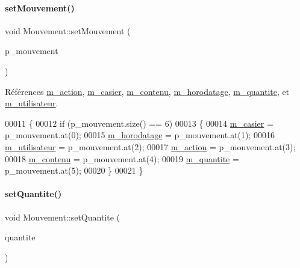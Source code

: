 \paragraph{\texorpdfstring{set\+Mouvement()}{setMouvement()}}
{\footnotesize\ttfamily void Mouvement\+::set\+Mouvement (\begin{DoxyParamCaption}\item[{Q\+String\+List}]{p\+\_\+mouvement }\end{DoxyParamCaption})}



Références \hyperlink{class_mouvement_af0444a7f837bdf252f2a3ccd4eb8a701}{m\+\_\+action}, \hyperlink{class_mouvement_a186f483cf82ff2866da1e10031838567}{m\+\_\+casier}, \hyperlink{class_mouvement_a631b133243576c36fec6e1912415d7d6}{m\+\_\+contenu}, \hyperlink{class_mouvement_a24f34a74c17068f6c98635400862adcd}{m\+\_\+horodatage}, \hyperlink{class_mouvement_ab6040d52ca99ef88d253b1742e70ffd3}{m\+\_\+quantite}, et \hyperlink{class_mouvement_adee253bf00365d1cb4c45bd58d8b3e58}{m\+\_\+utilisateur}.


\begin{DoxyCode}
00011 \{
00012     \textcolor{keywordflow}{if} (p\_mouvement.size() == 6)
00013     \{
00014         \hyperlink{class_mouvement_a186f483cf82ff2866da1e10031838567}{m\_casier} = p\_mouvement.at(0);
00015         \hyperlink{class_mouvement_a24f34a74c17068f6c98635400862adcd}{m\_horodatage} = p\_mouvement.at(1);
00016         \hyperlink{class_mouvement_adee253bf00365d1cb4c45bd58d8b3e58}{m\_utilisateur} = p\_mouvement.at(2);
00017         \hyperlink{class_mouvement_af0444a7f837bdf252f2a3ccd4eb8a701}{m\_action} = p\_mouvement.at(3);
00018         \hyperlink{class_mouvement_a631b133243576c36fec6e1912415d7d6}{m\_contenu} = p\_mouvement.at(4);
00019         \hyperlink{class_mouvement_ab6040d52ca99ef88d253b1742e70ffd3}{m\_quantite} = p\_mouvement.at(5);
00020     \}
00021 \}
\end{DoxyCode}
\mbox{\label{class_mouvement_aa9ed36b12cb4c46f851682d630cc28f8}} 
\paragraph{\texorpdfstring{set\+Quantite()}{setQuantite()}}
{\footnotesize\ttfamily void Mouvement\+::set\+Quantite (\begin{DoxyParamCaption}\item[{Q\+String}]{quantite }\end{DoxyParamCaption})}



